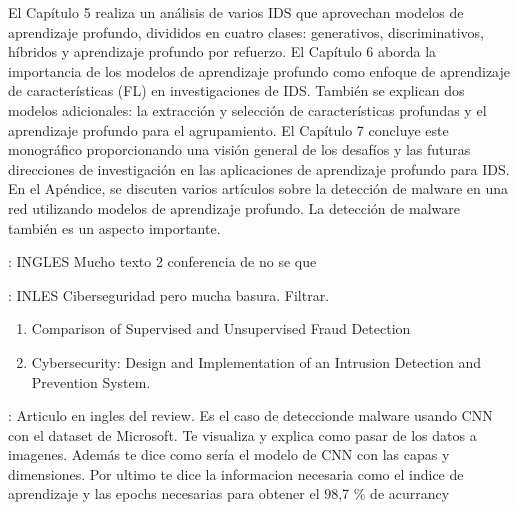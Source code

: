 \documentclass[11pt, a4paper]{article} %
\begin{document}
El Capítulo 5 realiza un análisis de varios IDS que aprovechan modelos de aprendizaje profundo, divididos en cuatro clases: generativos, discriminativos, híbridos y aprendizaje profundo por refuerzo.
El Capítulo 6 aborda la importancia de los modelos de aprendizaje profundo como enfoque de aprendizaje de características (FL) en investigaciones de IDS. También se explican dos modelos adicionales: la extracción y selección de características profundas y el aprendizaje profundo para el agrupamiento.
El Capítulo 7 concluye este monográfico proporcionando una visión general de los desafíos y las futuras direcciones de investigación en las aplicaciones de aprendizaje profundo para IDS.
En el Apéndice, se discuten varios artículos sobre la detección de malware en una red utilizando modelos de aprendizaje profundo. La detección de malware también es un aspecto importante.


\citep{xu2023machine} : INGLES Mucho texto 2 conferencia de no se que

\citep{alfaries2019advances} : INLES Ciberseguridad pero mucha basura. Filtrar.
\begin{enumerate}
\item Comparison of Supervised and Unsupervised Fraud Detection 
\item Cybersecurity: Design and Implementation of an Intrusion Detection
and Prevention System.
\end{enumerate}


\citep{kalash2018malware} : Articulo en ingles del review. Es el caso de deteccionde malware usando CNN con el dataset de Microsoft. Te visualiza y explica como pasar de los datos a imagenes. Además te dice como sería el modelo de CNN con las capas y dimensiones. Por ultimo te dice la informacion necesaria como el indice de aprendizaje y las epochs necesarias para obtener el 98,7 \% de acurrancy









\end{document}
